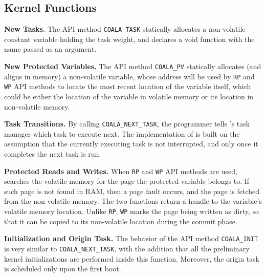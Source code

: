 \subsection{Kernel Functions}

\textbf{New Tasks.} The API method \texttt{COALA\_TASK} statically allocates a non-volatile constant variable holding the task weight, and declares a void function with the name passed as an argument.

\textbf{New Protected Variables.} The API method \texttt{COALA\_PV} statically allocates (and aligns in memory) a non-volatile variable, whose address will be used by \texttt{RP} and \texttt{WP} API methods to locate the most recent location of the variable itself, which could be either the location of the variable in volatile memory or its location in non-volatile memory.

\textbf{Task Transitions.} By calling \texttt{COALA\_NEXT\_TASK}, the programmer tells \sys's task manager which task to execute next. The implementation of \sys is built on the assumption that the currently executing task is not interrupted, and only once it completes the next task is run.

\textbf{Protected Reads and Writes.} When \texttt{RP} and \texttt{WP} API methods are used, \sys searches the volatile memory for the page the protected variable belongs to. If such page is not found in RAM, then a page fault occurs, and the page is fetched from the non-volatile memory. The two functions return a handle to the variable's volatile memory location. Unlike \texttt{RP}, \texttt{WP} marks the page being written as dirty, so that it can be copied to its non-volatile location during the commit phase.

\textbf{Initialization and Origin Task.} The behavior of the API method \texttt{COALA\_INIT} is very similar to \texttt{COALA\_NEXT\_TASK}, with the addition that all the preliminary kernel initializations are performed inside this function. Moreover, the origin task is scheduled only upon the first boot.



